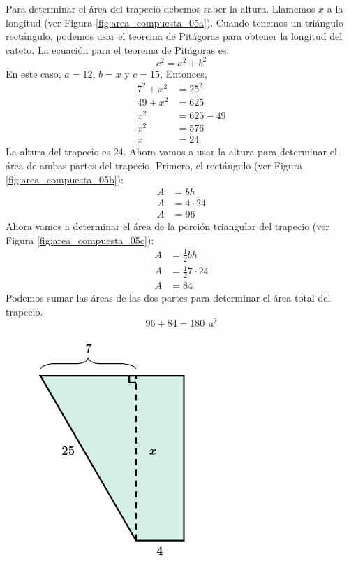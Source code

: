 \begin{solutionbox}{15cm}

    \begin{minipage}{0.7\textwidth}
        Para determinar el área del trapecio debemos saber la altura. Llamemos $x$ a la longitud (ver Figura \ref{fig:area_compuesta_05a}).
        Cuando tenemos un triángulo rectángulo, podemos usar el teorema de Pitágoras para obtener la longitud del cateto.
        La ecuación para el teorema de Pitágoras es:
        \[c^2=a^2+b^2\]
        En este caso, $a=12$, $b=x$ y $c=15$, Entonces,
        \begin{align*}
            7^2+x^2 & =25^2   \\
            49+x^2  & =625    \\
            x^2     & =625-49 \\
            x^2     & =576    \\
            x       & =24
        \end{align*}
        La altura del trapecio es 24. Ahora vamos a usar la altura para determinar el área de ambas partes del trapecio.
        Primero, el rectángulo (ver Figura \ref{fig:area_compuesta_05b}):
        \begin{align*}
            A & =bh        \\
            A & =4\cdot 24 \\
            A & =96
        \end{align*}
        Ahora vamos a determinar el área de la porción triangular del trapecio (ver Figura \ref{fig:area_compuesta_05c}):
        \begin{align*}
            A & =\frac{1}{2}bh        \\
            A & =\frac{1}{2}7\cdot 24 \\
            A & =84
        \end{align*}
        Podemos sumar las áreas de las dos partes para determinar el área total del trapecio.
        \[96+84=180 \text{ u}^2\]
    \end{minipage}\hfill
    \begin{minipage}{0.25\textwidth}
        \begin{figure}[H]
            \centering
            \includegraphics[width=0.5\linewidth]{../images/area_compuesta_05a.png}

\end{figure}
\end{minipage}
\end{solutionbox}
